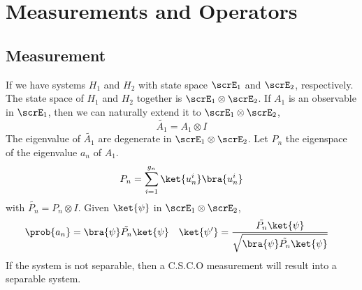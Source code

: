 \chapter{Measurements and Operators}
\section{Measurement}
If we have systems \(H_1\) and \(H_2\) with state space \(\scrE_1\) and \(\scrE_2\), respectively. The state space of \(H_1\) and \(H_2\) together is \(\scrE_1 \otimes \scrE_2\). If \(A_1\) is an observable in \(\scrE_1\), then we can naturally extend it to \(\scrE_1 \otimes \scrE_2\),
\begin{equation*}
    \tilde{A_1} = A_1 \otimes I
\end{equation*}
The eigenvalue of \(\tilde{A_1}\) are degenerate in \(\scrE_1 \otimes \scrE_2\). Let \(P_n\) the eigenspace of the eigenvalue \(a_n\) of \(A_1\).
\begin{equation*}
    P_n = \sum_{i = 1}^{g_n} \ket{u_n^i} \bra{u_n^i}
\end{equation*}
with \(\tilde{P_n} = P_n \otimes I\). Given \(\ket{\psi}\) in \(\scrE_1 \otimes \scrE_2\),
\begin{align*}
    \prob{a_n} & = \bra{\psi} \tilde{P_n} \ket{\psi} & \ket{\psi'} & = \dfrac{\tilde{P_n} \ket{\psi}}{\sqrt{ \bra{\psi} \tilde{P_n} \ket{\psi} }}
\end{align*}
If the system is not separable, then a C.S.C.O measurement will result into a separable system.
